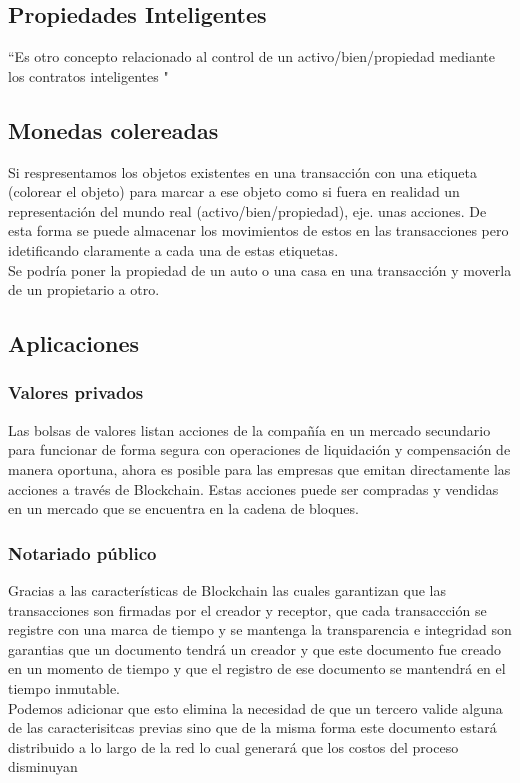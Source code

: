 \subsection{Propiedades Inteligentes}
``Es otro concepto relacionado al control de un activo/bien/propiedad mediante los contratos inteligentes "
\citep{crosby2016blockchain}

\subsection{Monedas colereadas}
Si respresentamos los objetos existentes en una transacción con una etiqueta (colorear el objeto) para marcar a ese objeto como si fuera en realidad un representación del mundo real (activo/bien/propiedad), eje. unas acciones.
De esta forma se puede almacenar los movimientos de estos en las transacciones pero idetificando claramente a cada una de estas etiquetas.
\\
Se podría poner la propiedad de un auto o una casa en una transacción y moverla de un propietario a otro. \citep{crosby2016blockchain}



\subsection{Aplicaciones}

\subsubsection{Valores privados}
Las bolsas de valores listan acciones de la compañía en un mercado secundario para funcionar de forma segura con operaciones de liquidación y compensación de manera oportuna, ahora es posible para las empresas que emitan directamente las acciones a través de Blockchain. Estas acciones puede ser compradas y vendidas en un mercado que se encuentra en la cadena de bloques. \citep{crosby2016blockchain}

\subsubsection{Notariado público}
Gracias a las características de Blockchain las cuales garantizan que las transacciones son firmadas por el creador y receptor, que cada transaccción se registre con una marca de tiempo y se mantenga la transparencia e integridad son garantias que un documento  tendrá un creador y que este documento fue creado en un momento de tiempo y que el registro de ese documento se mantendrá en el tiempo inmutable. \citep{zheng2016blockchain}
\\Podemos adicionar que esto elimina la necesidad de que un tercero valide alguna de las caracterisitcas previas sino que de la misma forma este documento estará distribuido a lo largo de la red lo cual generará que los costos del proceso disminuyan \citep{crosby2016blockchain}
